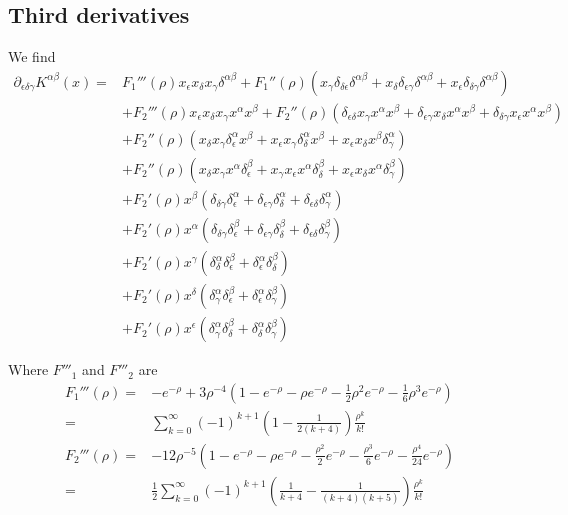 \documentclass[12pt]{amsart}
\begin{document}
\subsection{Third derivatives}
We find
\begin{align*}
  \partial_{\epsilon\delta\gamma}K^{\alpha\beta}(x) =& F_1'''(\rho) x_\epsilon x_\delta x_\gamma \delta^{\alpha\beta} 
  + F_1''(\rho) \left( x_\gamma \delta_{\delta\epsilon} \delta^{\alpha\beta} + x_\delta \delta_{\epsilon\gamma}\delta^{\alpha\beta} + x_\epsilon \delta_{\delta\gamma}\delta^{\alpha\beta} \right) \\
  &+ F_2'''(\rho) x_\epsilon x_\delta x_\gamma x^\alpha x^\beta 
  + F_2''(\rho) \left( \delta_{\epsilon\delta} x_\gamma x^\alpha x^\beta 
    + \delta_{\epsilon\gamma} x_\delta x^\alpha x^\beta 
    + \delta_{\delta\gamma} x_\epsilon x^\alpha x^\beta \right) \\
  &+ F_2''(\rho) \left( x_\delta x_\gamma \delta_{\epsilon}^\alpha x^\beta
    + x_\epsilon x_\gamma \delta_{\delta}^\alpha x^\beta
    + x_\epsilon x_\delta x^\beta \delta_\gamma^\alpha \right) \\
  &+ F_2''(\rho) \left( x_\delta x_\gamma x^\alpha \delta_\epsilon^\beta
    + x_\gamma x_\epsilon x^\alpha \delta_\delta^\beta 
    + x_\epsilon x_\delta x^\alpha \delta_\gamma^\beta \right) \\
  &+ F_2'(\rho) x^\beta \left( \delta_{\delta\gamma} \delta_\epsilon^\alpha 
    + \delta_{\epsilon\gamma} \delta_\delta^\alpha
    + \delta_{\epsilon\delta} \delta_\gamma^\alpha \right) \\
  &+ F_2'(\rho) x^\alpha \left( \delta_{\delta\gamma} \delta_\epsilon^\beta
    + \delta_{\epsilon\gamma} \delta_\delta^\beta 
    + \delta_{\epsilon\delta}\delta_\gamma^\beta\right) \\
  &+ F_2'(\rho) x^\gamma \left( \delta_\delta^\alpha \delta_\epsilon^\beta
    + \delta_\epsilon^\alpha \delta_\delta^\beta \right) \\
  &+ F_2'(\rho) x^\delta \left( \delta_\gamma^\alpha \delta_\epsilon^\beta 
    + \delta_\epsilon^\alpha \delta_\gamma^\beta \right) \\
  &+ F_2'(\rho) x^\epsilon \left( \delta_\gamma^\alpha \delta_\delta^\beta + \delta_\delta^\alpha \delta_\gamma^\beta \right)
\end{align*}

Where $F'''_1$ and $F'''_2$ are
\begin{align*}
  F_1'''(\rho) =& -e^{-\rho} + 3 \rho^{-4} \left( 1 - e^{-\rho} - \rho e^{-\rho} - \frac{1}{2} \rho^2 e^{-\rho} - \frac{1}{6} \rho^3 e^{-\rho} \right)\\
  =& \sum_{k=0}^{\infty} (-1)^{k+1} \left( 1 - \frac{1}{2(k+4)} \right) \frac{\rho^k}{k!} \\
  F_2'''(\rho) =& -12 \rho^{-5} \left( 1 - e^{-\rho} - \rho e^{-\rho} - \frac{\rho^2}{2} e^{-\rho} - \frac{\rho^3}{6} e^{-\rho} - \frac{\rho^4}{24} e^{-\rho} \right) \\
  =& \frac{1}{2} \sum_{k=0}^{\infty} (-1)^{k+1} \left( \frac{1}{k+4} - \frac{1}{(k+4)(k+5)} \right) \frac{\rho^k}{k!}
\end{align*}





\end{document}
